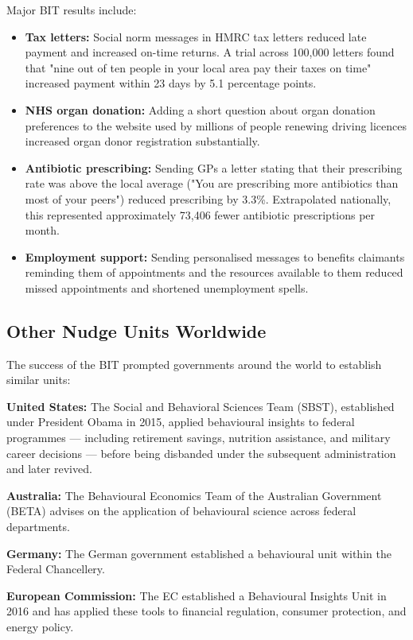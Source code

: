 \documentclass[12pt, letterpaper]{article}
\begin{document}
Major BIT results include:
\begin{itemize}
\item \textbf{Tax letters:} Social norm messages in HMRC tax letters reduced late payment and increased on-time returns. A trial across 100,000 letters found that "nine out of ten people in your local area pay their taxes on time" increased payment within 23 days by 5.1 percentage points.
\item \textbf{NHS organ donation:} Adding a short question about organ donation preferences to the website used by millions of people renewing driving licences increased organ donor registration substantially.
\item \textbf{Antibiotic prescribing:} Sending GPs a letter stating that their prescribing rate was above the local average ("You are prescribing more antibiotics than most of your peers") reduced prescribing by 3.3\%. Extrapolated nationally, this represented approximately 73,406 fewer antibiotic prescriptions per month.
\item \textbf{Employment support:} Sending personalised messages to benefits claimants reminding them of appointments and the resources available to them reduced missed appointments and shortened unemployment spells.
\end{itemize}


\subsection{Other Nudge Units Worldwide}


The success of the BIT prompted governments around the world to establish similar units:

\textbf{United States:} The Social and Behavioral Sciences Team (SBST), established under President Obama in 2015, applied behavioural insights to federal programmes --- including retirement savings, nutrition assistance, and military career decisions --- before being disbanded under the subsequent administration and later revived.

\textbf{Australia:} The Behavioural Economics Team of the Australian Government (BETA) advises on the application of behavioural science across federal departments.

\textbf{Germany:} The German government established a behavioural unit within the Federal Chancellery.

\textbf{European Commission:} The EC established a Behavioural Insights Unit in 2016 and has applied these tools to financial regulation, consumer protection, and energy policy.
\end{document}
